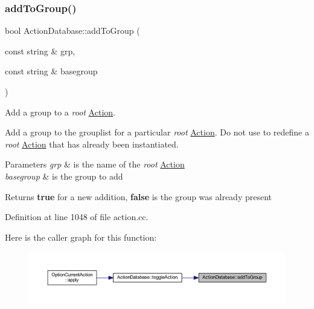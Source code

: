 \subsubsection{\texorpdfstring{addToGroup()}{addToGroup()}}
{\footnotesize\ttfamily bool Action\+Database\+::add\+To\+Group (\begin{DoxyParamCaption}\item[{const string \&}]{grp,  }\item[{const string \&}]{basegroup }\end{DoxyParamCaption})}



Add a group to a {\itshape root} \mbox{\hyperlink{class_action}{Action}}. 

Add a group to the grouplist for a particular {\itshape root} \mbox{\hyperlink{class_action}{Action}}. Do not use to redefine a {\itshape root} \mbox{\hyperlink{class_action}{Action}} that has already been instantiated. 
\begin{DoxyParams}{Parameters}
{\em grp} & is the name of the {\itshape root} \mbox{\hyperlink{class_action}{Action}} \\
\hline
{\em basegroup} & is the group to add \\
\hline
\end{DoxyParams}
\begin{DoxyReturn}{Returns}
{\bfseries{true}} for a new addition, {\bfseries{false}} is the group was already present 
\end{DoxyReturn}


Definition at line 1048 of file action.\+cc.

Here is the caller graph for this function\+:
\nopagebreak
\begin{figure}[H]
\begin{center}
\leavevmode
\includegraphics[width=350pt]{class_action_database_a7b00339734448a709998615ced5cbd04_icgraph}
\end{center}
\end{figure}
\mbox{\label{class_action_database_a8a73393a21e7ae50bcdb138eab1dcaff}} 

